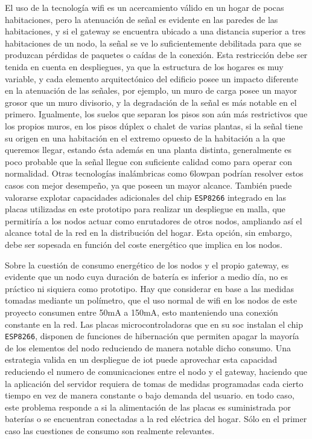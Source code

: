 El uso de la tecnología \gls{wifi} es un acercamiento válido en un hogar de pocas habitaciones, pero la atenuación de señal es evidente en las paredes de las habitaciones, y si el \gls{gateway} se encuentra ubicado a una distancia superior a tres habitaciones de un nodo, la señal se ve lo suficientemente debilitada para que se produzcan pérdidas de paquetes o caídas de la conexión. Esta restricción debe ser tenida en cuenta en despliegues, ya que la estructura de los hogares es muy variable, y cada elemento arquitectónico del edificio posee un impacto diferente en la atenuación de las señales, por ejemplo, un muro de carga posee un mayor grosor que un muro divisorio, y la degradación de la señal es más notable en el primero. Igualmente, los suelos que separan los pisos son aún más restrictivos que los propios muros, en los pisos dúplex o chalet de varias plantas, si la señal tiene su origen en una habitación en el extremo opuesto de la habitación a la que queremos llegar, estando ésta además en una planta distinta, generalmente es poco probable que la señal llegue con suficiente calidad como para operar con normalidad. Otras tecnologías inalámbricas como \gls{6lowpan} podrían resolver estos casos con mejor desempeño, ya que poseen un mayor alcance. También puede valorarse explotar capacidades adicionales del chip \verb|ESP8266| integrado en las placas utilizadas en este prototipo para realizar un despliegue en malla, que permitiría a los nodos actuar como enrutadores de otros nodos, ampliando así el alcance total de la red en la distribución del hogar. Esta opción, sin embargo, debe ser sopesada en función del coste energético que implica en los nodos.

\vspace{1cm}

Sobre la cuestión de consumo energético de los nodos y el propio \gls{gateway}, es evidente que un nodo cuya duración de batería es inferior a medio día, no es práctico ni siquiera como prototipo. Hay que considerar en base a las medidas tomadas mediante un polímetro, que el uso normal de \gls{wifi} en los nodos de este proyecto consumen entre 50mA a 150mA, esto manteniendo una conexión constante en la red. Las placas microcontroladoras que en su \gls{soc} instalan el chip \verb|ESP8266|, disponen de funciones de hibernación que permiten apagar la mayoría de los elementos del nodo reduciendo de manera notable dicho consumo. Una estrategia valida en un despliegue de \gls{iot} puede aprovechar esta capacidad reduciendo el numero de comunicaciones entre el nodo y el \gls{gateway}, haciendo que la aplicación del servidor requiera de tomas de medidas programadas cada cierto tiempo en vez de manera constante o bajo demanda del usuario. en todo caso, este problema responde a si la alimentación de las placas es suministrada por baterías o se encuentran conectadas a la red eléctrica del hogar. Sólo en el primer caso las cuestiones de consumo son realmente relevantes.

